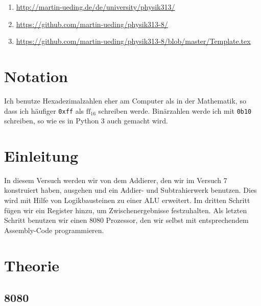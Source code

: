 \begin{enumerate}
	\item
		\label{it:mu}
		\url{http://martin-ueding.de/de/university/physik313/}
	\item
		\label{it:github/alles}
		\url{https://github.com/martin-ueding/physik313-8/}
	\item
		\label{it:github/template}
		\url{https://github.com/martin-ueding/physik313-8/blob/master/Template.tex}
\end{enumerate}

\section*{Notation}

Ich benutze Hexadezimalzahlen eher am Computer als in der Mathematik, so dass
ich häufiger \texttt{0xff} als $\mathrm{ff_{16}}$ schreiben werde. Binärzahlen
werde ich mit \texttt{0b10} schreiben, so wie es in Python 3 auch gemacht wird.

\newpage
\tableofcontents
\newpage


\section{Einleitung}

In diesem Versuch werden wir von dem Addierer, den wir im Versuch 7 konstruiert
haben, ausgehen und ein Addier- und Subtrahierwerk benutzen. Dies wird mit
Hilfe von Logikbausteinen zu einer ALU erweitert. Im dritten Schritt fügen wir
ein Register hinzu, um Zwischenergebnisse festzuhalten. Als letzten Schritt
benutzen wir einen 8080 Prozessor, den wir selbst mit entsprechendem
Assembly-Code programmieren.


\FloatBarrier
\section{Theorie}

\subsection{8080}

